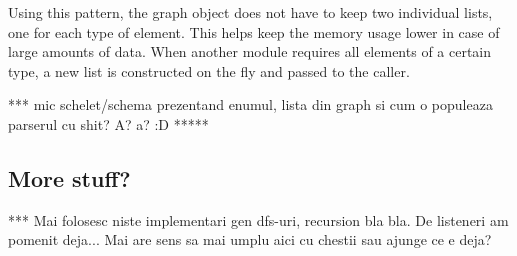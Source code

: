 Using this pattern, the graph object does not have to keep two individual lists, one for each type of element. This 
helps keep the memory usage lower in case of large amounts of data. When another module requires all elements of a 
certain type, a new list is constructed on the fly and passed to the caller.

*** mic schelet/schema prezentand enumul, lista din graph si cum o populeaza parserul cu shit? A? a? :D *****

\subsection{More stuff?}

*** Mai folosesc niste implementari gen dfs-uri, recursion bla bla. De listeneri am pomenit deja... Mai are sens sa mai 
umplu aici cu chestii sau ajunge ce e deja?

